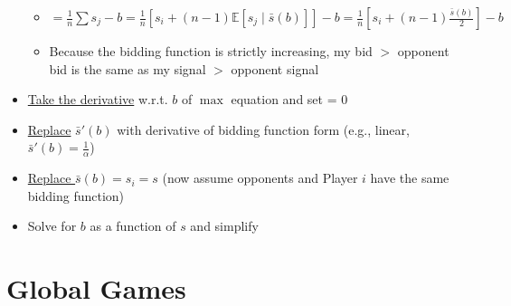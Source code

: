 \documentclass{report}
\newcommand{\FlowerSmall}{\mbox{\raisebox{-1pt}{\small\EightFlowerPetalRemoved}}} %
\begin{document}
\begin{mdframed}
\begin{itemize}[label=\FlowerSmall]
			\begin{itemize}
				\item $= \frac{1}{n} \sum s_j - b = \frac{1}{n} \left[ s_i + (n-1) \mathbb{E}[s_j \mid \bar{s}(b)] \right] - b = \frac{1}{n} \left[ s_i + (n-1) \frac{\bar{s}(b)}{2} \right] - b$
				\item Because the bidding function is strictly increasing, my bid $>$ opponent bid is the same as my signal $>$ opponent signal
			\end{itemize}
		\item \underline{Take the derivative} w.r.t. $b$ of $\max$ equation and set = 0
		\item \underline{Replace} $\bar{s}'(b)$ with derivative of bidding function form (e.g., linear, $\bar{s}'(b) = \frac{1}{\alpha}$)
		\item \underline{Replace $\bar{s}(b) = s_i = s$} (now assume opponents and Player $i$ have the same bidding function)
		\item Solve for $b$ as a function of $s$ and simplify
	\end{itemize}
	\smallskip
\end{mdframed}
\bigskip

\newpage
\section*{Global Games}\medskip
\end{document}
